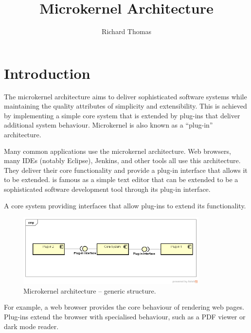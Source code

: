 \title{Microkernel Architecture}
\author{Richard Thomas}
\date{}

\maketitle

\section{Introduction}

The microkernel architecture aims to deliver sophisticated software systems while maintaining the quality attributes of simplicity and extensibility.
This is achieved by implementing a simple core system that is extended by plug-ins that deliver additional system behaviour.
Microkernel is also known as a ``plug-in'' architecture.

Many common applications use the microkernel architecture.
Web browsers, many IDEs (notably Eclipse), Jenkins, and other tools all use this architecture.
They deliver their core functionality and provide a plug-in interface that allows it to be extended.
 is famous as a simple text editor that
can be extended to be a sophisticated software development tool through its plug-in interface.

\vspace{2mm}
\begin{definition}
    A core system providing interfaces that allow plug-ins to extend its functionality.
\end{definition}

\begin{figure}[h!]
    \centering
    \includegraphics[trim=38 120 22 110,clip,width=0.85\textwidth]{diagrams/generic-microkernel.png}
    \caption{Microkernel architecture -- generic structure.}
    \label{fig:microkernel}
\end{figure}

For example, a web browser provides the core behaviour of rendering web pages.
Plug-ins extend the browser with specialised behaviour, such as a PDF viewer or dark mode reader.


